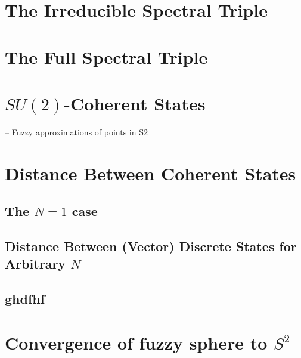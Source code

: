 \section{The Irreducible Spectral Triple}

\section{The Full Spectral Triple}

\section{$SU(2)$-Coherent States}

-- Fuzzy approximations of points in S2

\section{Distance Between Coherent States}

\subsection{The $N=1$ case}

\subsection{Distance Between (Vector) Discrete States for Arbitrary $N$}

\subsection{ghdfhf}

\section{Convergence of fuzzy sphere to $S^2$}\label{FSsec:convergence}